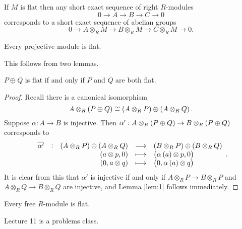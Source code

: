 If $ M $ is flat then any short exact sequence of right $ R $-modules
$$ 0 \to A \to B \to C \to 0 $$
corresponds to a short exact sequence of abelian groups
$$ 0 \to A \otimes_R M \to B \otimes_R M \to C \otimes_R M \to 0. $$

\begin{proposition}
Every projective module is flat.
\end{proposition}

This follows from two lemmas.

\begin{lemma}
\label{lem:1}
$ P \oplus Q $ is flat if and only if $ P $ and $ Q $ are both flat.
\end{lemma}

\begin{proof}
Recall there is a canonical isomorphism
$$ A \otimes_R \br{P \oplus Q} \cong \br{A \otimes_R P} \oplus \br{A \otimes_R Q}. $$
Suppose $ \alpha : A \to B $ is injective. Then $ \alpha' : A \otimes_R \br{P \oplus Q} \to B \otimes_R \br{P \oplus Q} $ corresponds to
$$ \functions[\overline{\alpha'}]{\br{A \otimes_R P} \oplus \br{A \otimes_R Q}}{\br{B \otimes_R P} \oplus \br{B \otimes_R Q}}{\br{a \otimes p, 0}}{\br{\alpha\br{a} \otimes p, 0}}{\br{0, a \otimes q}}{\br{0, \alpha\br{a} \otimes q}}. $$
It is clear from this that $ \overline{\alpha'} $ is injective if and only if $ A \otimes_R P \to B \otimes_R P $ and $ A \otimes_R Q \to B \otimes_R Q $ are injective, and Lemma \ref{lem:1} follows immediately.
\end{proof}

\begin{lemma}
Every free $ R $-module is flat.
\end{lemma}


Lecture 11 is a problems class.

